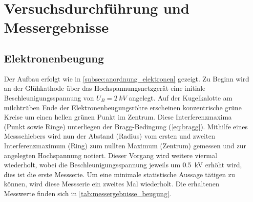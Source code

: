 \documentclass[ngerman]{scrartcl}
\begin{document}
\section{Versuchsdurchführung und Messergebnisse}
\label{sec:versuchsdurchfuehrung_messergebnisse}

\subsection{Elektronenbeugung}
\label{subsec:durchfuehrung_elektronenbeugung}

Der Aufbau erfolgt wie in \autoref{subsec:anordnung_elektronen} gezeigt. Zu Beginn wird an der Glühkathode über das Hochspannungsnetzgerät eine initiale Beschleunigungsspannung von $U_B = \SI{2}{kV}$ angelegt. Auf der Kugelkalotte am milchtrüben Ende der Elektronenbeugungsröhre erscheinen konzentrische grüne Kreise um einen hellen grünen Punkt im Zentrum. Diese Interferenzmaxima (Punkt sowie Ringe) unterliegen der Bragg-Bedingung (\autoref{eq:bragg}). Mithilfe eines Messschiebers wird nun der Abstand (Radius) vom ersten und zweiten Interferenzmaximum (Ring) zum nullten Maximum (Zentrum) gemessen und zur angelegten Hochspannung notiert. Dieser Vorgang wird weitere viermal wiederholt, wobei die Beschleunigungsspannung jeweils um \SI{0.5}{kV} erhöht wird, dies ist die erste Messserie. Um eine minimale statistische Aussage tätigen zu können, wird diese Messserie ein zweites Mal wiederholt. Die erhaltenen Messwerte finden sich in \autoref{tab:messergebnisse_beugung}.
%
\end{document}
